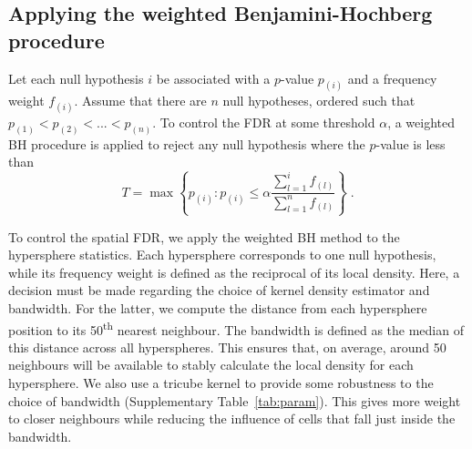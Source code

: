 \documentclass{article}
\begin{document}
\subsection{Applying the weighted Benjamini-Hochberg procedure}
Let each null hypothesis $i$ be associated with a $p$-value $p_{(i)}$ and a frequency weight $f_{(i)}$.
Assume that there are $n$ null hypotheses, ordered such that $p_{(1)} < p_{(2)} < ... < p_{(n)}$.
To control the FDR at some threshold $\alpha$, a weighted BH procedure is applied \cite{benjamini1997multiple} to reject any null hypothesis where the $p$-value is less than
\[
    T = \max\left\{ p_{(i)} : p_{(i)} \le \alpha \frac{\sum_{l=1}^{i} f_{(l)}}{\sum_{l=1}^{n} f_{(l)}} \right\}  \;.
\]

To control the spatial FDR, we apply the weighted BH method to the hypersphere statistics.
Each hypersphere corresponds to one null hypothesis, while its frequency weight is defined as the reciprocal of its local density.
Here, a decision must be made regarding the choice of kernel density estimator and bandwidth.
For the latter, we compute the distance from each hypersphere position to its 50\textsuperscript{th} nearest neighbour.
The bandwidth is defined as the median of this distance across all hyperspheres.
This ensures that, on average, around 50 neighbours will be available to stably calculate the local density for each hypersphere.
We also use a tricube kernel to provide some robustness to the choice of bandwidth (Supplementary Table~\ref{tab:param}).
This gives more weight to closer neighbours while reducing the influence of cells that fall just inside the bandwidth.
\end{document}
